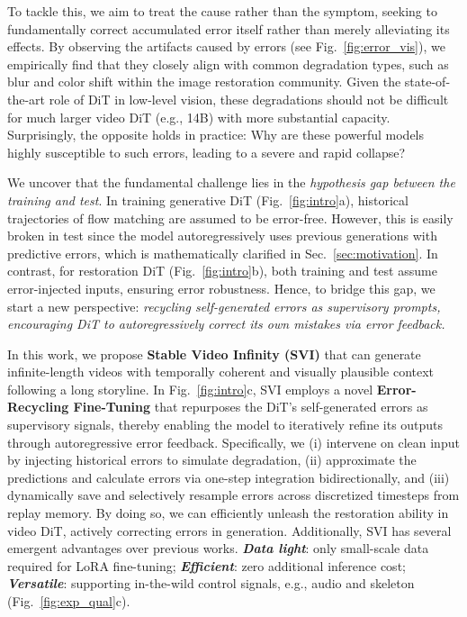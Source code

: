 \documentclass{article} %
\newcommand{\method}{Stable Video Infinity }
\newcommand{\highlight}[1]{\textbf{\emph{#1}}}
\begin{document}
To tackle this, we aim to treat the cause rather than the symptom, seeking to {fundamentally correct accumulated error itself rather than merely alleviating its effects}. By observing the artifacts caused by errors (see Fig.~\ref{fig:error_vis}), we empirically find that they closely align with common degradation types, such as blur and color shift within the image restoration community. Given the state-of-the-art role of DiT in low-level vision, these degradations should not be difficult for much larger video DiT (e.g., 14B) with more substantial capacity. Surprisingly, the opposite holds in practice: Why are these powerful models highly susceptible to such errors, leading to a severe and rapid collapse?

We uncover that the fundamental challenge lies in the \emph{hypothesis gap between the training and test}. In training generative DiT (Fig.~\ref{fig:intro}a), historical trajectories of flow matching are assumed to be error-free. However, this is easily broken in test since the model autoregressively uses previous generations with predictive errors, which is mathematically clarified in Sec.~\ref{sec:motivation}. In contrast, for restoration DiT (Fig.~\ref{fig:intro}b), both training and test assume error-injected inputs, ensuring error robustness. Hence, to bridge this gap, we start a new perspective: \emph{recycling self-generated errors as supervisory prompts, encouraging DiT to autoregressively correct its own mistakes via error feedback.}

In this work, we propose \textbf{\method (SVI)} that can generate infinite-length videos with temporally coherent and visually plausible context following a long storyline. In Fig.~\ref{fig:intro}c, SVI employs a novel \textbf{Error-Recycling Fine-Tuning} that repurposes the DiT's self-generated errors as supervisory signals, thereby enabling the model to iteratively refine its outputs through autoregressive error feedback. Specifically, we (i) intervene on clean input by injecting historical errors to simulate degradation, (ii) approximate the predictions and calculate errors via one-step integration bidirectionally, and (iii) dynamically save and selectively resample errors across discretized timesteps from replay memory. By doing so, we can efficiently unleash the restoration ability in video DiT, actively correcting errors in generation. Additionally, SVI has several emergent advantages over previous works. \highlight{Data light}: only small-scale data required for LoRA fine-tuning; \highlight{Efficient}: zero additional inference cost; \highlight{Versatile}: supporting in-the-wild control signals, e.g., audio and skeleton (Fig.~\ref{fig:exp_qual}c). 
\end{document}
